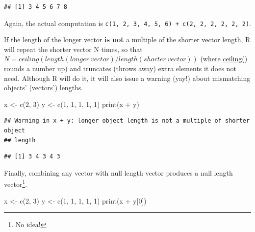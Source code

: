 \documentclass[
]{book}
\newenvironment{Shaded}{\begin{snugshade}}{\end{snugshade}}
\newcommand{\DecValTok}[1]{\textcolor[rgb]{0.00,0.00,0.81}{#1}}
\newcommand{\FunctionTok}[1]{\textcolor[rgb]{0.00,0.00,0.00}{#1}}
\newcommand{\NormalTok}[1]{#1}
\newcommand{\OtherTok}[1]{\textcolor[rgb]{0.56,0.35,0.01}{#1}}
\newcommand{\SpecialCharTok}[1]{\textcolor[rgb]{0.00,0.00,0.00}{#1}}
\begin{document}
\begin{verbatim}
## [1] 3 4 5 6 7 8
\end{verbatim}

Again, the actual computation is \texttt{c(1,\ 2,\ 3,\ 4,\ 5,\ 6)\ +\ c(2,\ 2,\ 2,\ 2,\ 2,\ 2)}.

If the length of the longer vector \textbf{is not} a multiple of the shorter vector length, R will repeat the shorter vector N times, so that \(N = ceiling(length(longer~vector) / length(shorter~vector))\) (where \href{https://stat.ethz.ch/R-manual/R-devel/library/base/html/Round.html}{ceiling()} rounds a number up) and truncates (throws away) extra elements it does not need. Although R will do it, it will also issue a warning (yay!) about mismatching objects' (vectors') lengths.

\begin{Shaded}
\begin{Highlighting}[]
\NormalTok{x }\OtherTok{\textless{}{-}} \FunctionTok{c}\NormalTok{(}\DecValTok{2}\NormalTok{, }\DecValTok{3}\NormalTok{)}
\NormalTok{y }\OtherTok{\textless{}{-}} \FunctionTok{c}\NormalTok{(}\DecValTok{1}\NormalTok{, }\DecValTok{1}\NormalTok{, }\DecValTok{1}\NormalTok{, }\DecValTok{1}\NormalTok{, }\DecValTok{1}\NormalTok{)}
\FunctionTok{print}\NormalTok{(x }\SpecialCharTok{+}\NormalTok{ y)}
\end{Highlighting}
\end{Shaded}

\begin{verbatim}
## Warning in x + y: longer object length is not a multiple of shorter object
## length
\end{verbatim}

\begin{verbatim}
## [1] 3 4 3 4 3
\end{verbatim}

Finally, combining any vector with null length vector produces a null length vector\footnote{No idea!}.

\begin{Shaded}
\begin{Highlighting}[]
\NormalTok{x }\OtherTok{\textless{}{-}} \FunctionTok{c}\NormalTok{(}\DecValTok{2}\NormalTok{, }\DecValTok{3}\NormalTok{)}
\NormalTok{y }\OtherTok{\textless{}{-}} \FunctionTok{c}\NormalTok{(}\DecValTok{1}\NormalTok{, }\DecValTok{1}\NormalTok{, }\DecValTok{1}\NormalTok{, }\DecValTok{1}\NormalTok{, }\DecValTok{1}\NormalTok{)}
\FunctionTok{print}\NormalTok{(x }\SpecialCharTok{+}\NormalTok{ y[}\DecValTok{0}\NormalTok{])}
\end{Highlighting}
\end{Shaded}
\end{document}
